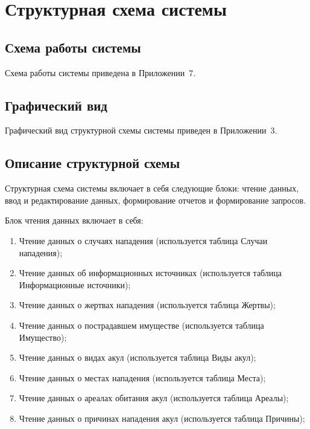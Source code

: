 \documentclass[russian,utf8,simple,emptystyle]{eskdtext}
\begin{document}
\clearpage
\section{Структурная схема системы}
\subsection{Схема работы системы}
Схема работы системы приведена в Приложении~7.

\subsection{Графический вид}
Графический вид структурной схемы системы приведен в Приложении~3.

\subsection{Описание структурной схемы}
Структурная схема системы включает в себя следующие блоки: чтение данных, ввод и редактирование данных, формирование отчетов и формирование запросов.

Блок чтения данных включает в себя:
\begin{enumerate}
\item Чтение данных о случаях нападения (используется таблица Случаи нападения);
\item Чтение данных об информационных источниках (используется таблица Информационные источники);
\item Чтение данных о жертвах нападения (используется таблица Жертвы);
\item Чтение данных о пострадавшем имуществе (используется таблица Имущество);
\item Чтение данных о видах акул (используется таблица Виды акул);
\item Чтение данных о местах нападения (используется таблица Места);
\item Чтение данных о ареалах обитания акул (используется таблица Ареалы);
\item Чтение данных о причинах нападения акул (используется таблица Причины);
\end{enumerate}
\end{document}
